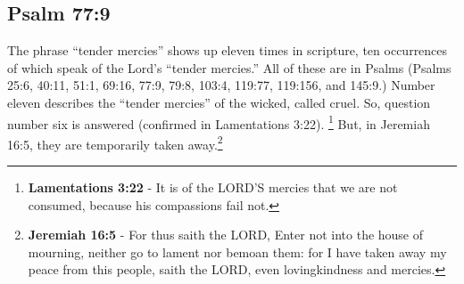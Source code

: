 \subsection{Psalm 77:9}
The phrase ``tender mercies'' shows up eleven times in scripture, ten occurrences of which speak of the Lord's ``tender mercies.'' All of these are in Psalms (Psalms 25:6, 40:11, 51:1, 69:16, 77:9, 79:8, 103:4, 119:77, 119:156, and  145:9.) Number eleven describes the ``tender mercies'' of the wicked, called cruel. So, question number six is answered (confirmed in Lamentations 3:22). \footnote{\textbf{Lamentations 3:22} - It is of the LORD’S mercies that we are not consumed, because his compassions fail not.} But, in Jeremiah 16:5, they are temporarily taken away.\footnote{\textbf{Jeremiah 16:5} - For thus saith the LORD, Enter not into the house of mourning, neither go to lament nor bemoan them: for I have taken away my peace from this people, saith the LORD, even lovingkindness and mercies.}\cite{Ruckman1992PsalmsV2}

